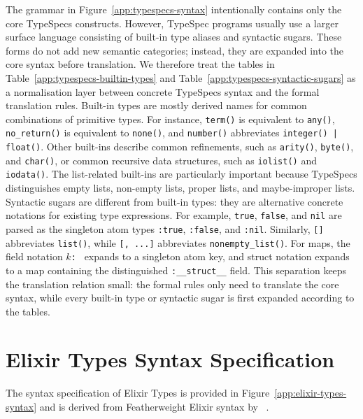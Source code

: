 

The grammar in Figure~\ref{app:typespecs-syntax} intentionally contains only the core TypeSpecs constructs. 
However, TypeSpec programs usually use a larger surface language consisting of built-in type aliases and syntactic sugars. 
These forms do not add new semantic categories; instead, they are expanded into the core syntax before translation. 
We therefore treat the tables in Table~\ref{app:typespecs-builtin-types} and Table~\ref{app:typespecs-syntactic-sugars} as a normalisation layer between concrete TypeSpecs syntax and the formal translation rules.
Built-in types are mostly derived names for common combinations of primitive types. 
For instance, \texttt{term()} is equivalent to \texttt{any()}, \texttt{no\_return()} is equivalent to \texttt{none()}, and \texttt{number()} abbreviates \texttt{integer() | float()}. 
Other built-ins describe common refinements, such as \texttt{arity()}, \texttt{byte()}, and \texttt{char()}, or common recursive data structures, such as \texttt{iolist()} and \texttt{iodata()}. 
The list-related built-ins are particularly important because TypeSpecs distinguishes empty lists, non-empty lists, proper lists, and maybe-improper lists.
Syntactic sugars are different from built-in types: they are alternative concrete notations for existing type expressions. 
For example, \texttt{true}, \texttt{false}, and \texttt{nil} are parsed as the singleton atom types \texttt{:true}, \texttt{:false}, and \texttt{:nil}. 
Similarly, \texttt{[\TST]} abbreviates \texttt{list(\TST)}, while \texttt{[\TST, ...]} abbreviates \texttt{nonempty\_list(\TST)}. 
For maps, the field notation \texttt{$k$:\,\TST} expands to a singleton atom key, and struct notation expands to a map containing the distinguished \texttt{:\_\_struct\_\_} field.
This separation keeps the translation relation small: the formal rules only need to translate the core syntax, while every built-in type or syntactic sugar is first expanded according to the tables.

\section{Elixir Types Syntax Specification}



The syntax specification of Elixir Types is provided in Figure~\ref{app:elixir-types-syntax} and is derived from Featherweight Elixir syntax by ~\cite{duboc2024}.

